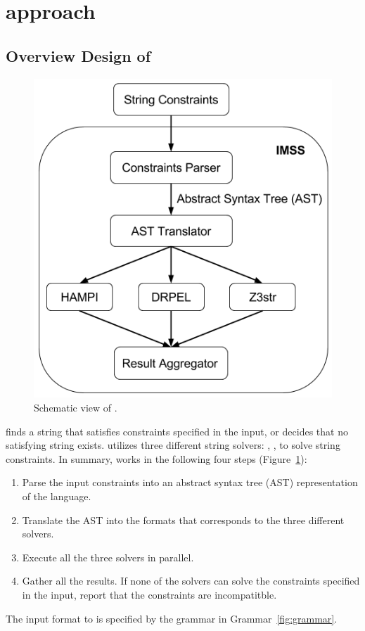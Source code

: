 \section{approach}
\label{sec:approach}

\subsection{Overview Design of \imss}

\begin{figure}[H]
    \centering
    \includegraphics[scale=0.45]{imss}
    \caption{\label{fig:imss}Schematic view of \imss.}
\end{figure}

\imss finds a string that satisfies constraints specified in the input,
or decides that no satisfying string exists. \imss utilizes three different
string solvers: \hampi, \dprle, \zstr to solve string
constraints. In summary, \imss works in the following four steps (Figure~\ref{fig:imss}):
\begin{enumerate}
    \item Parse the input constraints into an abstract syntax tree (AST)
    representation of the \imss language.
    \item Translate the AST into the formats that corresponds to the three different solvers.
    \item Execute all the three solvers in parallel.
    \item Gather all the results. If none of the solvers can solve the constraints
    specified in the input, report that the constraints are incompatitble.
\end{enumerate}
The input format to \imss is specified by the grammar in Grammar~\ref{fig:grammar}.

